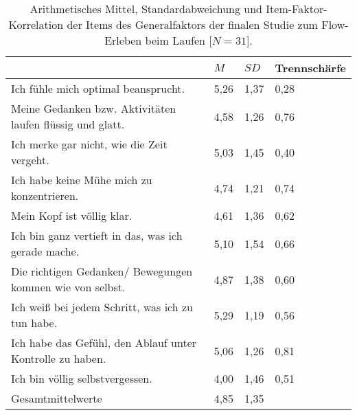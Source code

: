 \newpage
\begin{table}
	[!htb] \centering \caption[Item-Faktor-Korrelation der Items des Generalfaktors (Finale Studie: Laufen)]{Arithmetisches Mittel, Standardabweichung und Item-Faktor-Korrelation der Items des Generalfaktors der finalen Studie zum Flow-Erleben beim Laufen [$N = 31$].} \label{tab:generalfaktor_3} 
	\begin{tabularx}
		{ 
		\textwidth}{p{} p{} p{} p{}} \toprule & $M$ & $SD$ & Trennschärfe \\
		\midrule Ich fühle mich optimal beansprucht. & 5,26 & 1,37 & 0,28 \\
		Meine Gedanken bzw. Aktivitäten laufen flüssig und glatt. & 4,58 & 1,26 & 0,76 \\
		Ich merke gar nicht, wie die Zeit vergeht. & 5,03 & 1,45 & 0,40 \\
		Ich habe keine Mühe mich zu konzentrieren. & 4,74 & 1,21 & 0,74 \\
		Mein Kopf ist völlig klar. & 4,61 & 1,36 & 0,62 \\
		Ich bin ganz vertieft in das, was ich gerade mache. & 5,10 & 1,54 & 0,66 \\
		Die richtigen Gedanken/ Bewegungen kommen wie von selbst. & 4,87 & 1,38 & 0,60 \\
		Ich weiß bei jedem Schritt, was ich zu tun habe. & 5,29 & 1,19 & 0,56 \\
		Ich habe das Gefühl, den Ablauf unter Kontrolle zu haben. & 5,06 & 1,26 & 0,81 \\
		Ich bin völlig selbstvergessen. & 4,00 & 1,46 & 0,51 \\
		Gesamtmittelwerte & 4,85 & 1,35 & \\
		\bottomrule 
	\end{tabularx}
\end{table}
